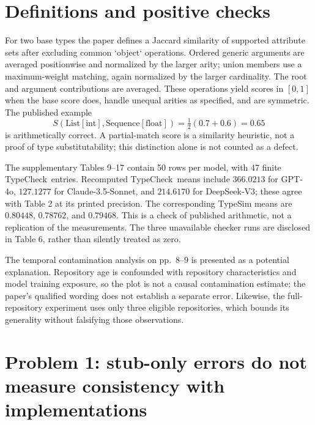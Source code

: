 \documentclass[10pt]{article}
\begin{document}
\section*{Definitions and positive checks}
For two base types the paper defines a Jaccard similarity of supported attribute sets after excluding common `object` operations. Ordered generic arguments are averaged positionwise and normalized by the larger arity; union members use a maximum-weight matching, again normalized by the larger cardinality. The root and argument contributions are averaged. These operations yield scores in \([0,1]\) when the base score does, handle unequal arities as specified, and are symmetric. The published example \[S(\mathrm{List[int]},\mathrm{Sequence[float]})
 =\tfrac12(0.7+0.6)=0.65\] is arithmetically correct. A partial-match score is a similarity heuristic, not a proof of type substitutability; this distinction alone is not counted as a defect.\par
The supplementary Tables 9–17 contain 50 rows per model, with 47 finite TypeCheck entries. Recomputed TypeCheck means include \(366.0213\) for GPT-4o, \(127.1277\) for Claude-3.5-Sonnet, and \(214.6170\) for DeepSeek-V3; these agree with Table 2 at its printed precision. The corresponding TypeSim means are \(0.80448\), \(0.78762\), and \(0.79468\). This is a check of published arithmetic, not a replication of the measurements. The three unavailable checker runs are disclosed in Table 6, rather than silently treated as zero.\par
The temporal contamination analysis on pp. 8–9 is presented as a potential explanation. Repository age is confounded with repository characteristics and model training exposure, so the plot is not a causal contamination estimate; the paper’s qualified wording does not establish a separate error. Likewise, the full-repository experiment uses only three eligible repositories, which bounds its generality without falsifying those observations.\par
\section*{Problem 1: stub-only errors do not measure consistency with implementations}
\end{document}

